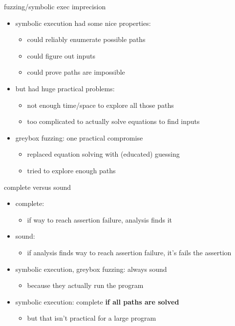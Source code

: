 \begin{frame}{fuzzing/symbolic exec imprecision}
    \begin{itemize}
    \item symbolic execution had some nice properties:
        \begin{itemize}
        \item could reliably enumerate possible paths
        \item could figure out inputs
        \item could prove paths are impossible
        \end{itemize}
    \item but had huge practical problems:
        \begin{itemize}
        \item not enough time/space to explore all those paths
        \item too complicated to actually solve equations to find inputs
        \end{itemize}
    \vspace{.5cm}
    \item greybox fuzzing: one practical compromise
        \begin{itemize}
        \item replaced equation solving with (educated) guessing
        \item tried to explore enough paths
        \end{itemize}
    \end{itemize}
\end{frame}

\begin{frame}{complete versus sound}
    \begin{itemize}
        \item complete:
            \begin{itemize}
            \item if way to reach assertion failure, analysis finds it
            \end{itemize}
        \item sound:
            \begin{itemize}
            \item if analysis finds way to reach assertion failure, it's fails the assertion
            \end{itemize}
        \vspace{.5cm}
        \item symbolic execution, greybox fuzzing: always sound
            \begin{itemize}
            \item because they actually run the program
            \end{itemize}
        \item symbolic execution: complete \textbf{if all paths are solved}
            \begin{itemize}
            \item but that isn't practical for a large program
            \end{itemize}
    \end{itemize}
\end{frame}

